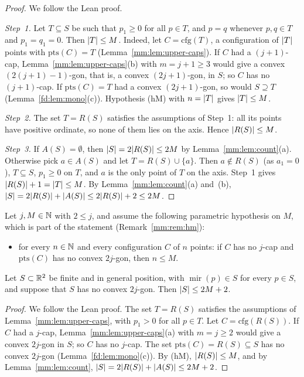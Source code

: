 \begin{proof}
We follow the Lean proof.

\emph{Step~1.} Let $T\subseteq S$ be such that $p_1\ge0$ for all $p\in T$, and $p=q$ whenever $p,q\in T$
and $p_1=q_1=0$. Then $\lvert T\rvert\le M$. Indeed, let $C=\mathrm{cfg}(T)$, a configuration of $\lvert T\rvert$ points
with $\mathrm{pts}(C)=T$ (Lemma~\ref{mm:lem:upper-caps}). If $C$ had a $(j+1)$-cap,
Lemma~\ref{mm:lem:upper-caps}(b) with $m=j+1\ge3$ would give a convex $(2(j+1)-1)$-gon, that is, a convex
$(2j+1)$-gon, in $S$; so $C$ has no $(j+1)$-cap. If $\mathrm{pts}(C)=T$ had a convex $(2j+1)$-gon, so would
$S\supseteq T$ (Lemma~\ref{fd:lem:mono}(c)). Hypothesis (hM) with $n=\lvert T\rvert$ gives $\lvert T\rvert\le M$.

\emph{Step~2.} The set $T=R(S)$ satisfies the assumptions of Step~1: all its points have positive
ordinate, so none of them lies on the axis. Hence $\lvert R(S)\rvert\le M$.

\emph{Step~3.} If $A(S)=\emptyset$, then $\lvert S\rvert=2\lvert R(S)\rvert\le2M$ by Lemma~\ref{mm:lem:count}(a).
Otherwise pick $a\in A(S)$ and let $T=R(S)\cup\{a\}$. Then $a\notin R(S)$ (as $a_1=0$), $T\subseteq S$,
$p_1\ge0$ on $T$, and $a$ is the only point of $T$ on the axis. Step~1 gives
$\lvert R(S)\rvert+1=\lvert T\rvert\le M$. By Lemma~\ref{mm:lem:count}(a) and~(b),
$\lvert S\rvert=2\lvert R(S)\rvert+\lvert A(S)\rvert\le2\lvert R(S)\rvert+2\le2M$.
\end{proof}

\begin{theorem}\label{mm:thm:even}
Let $j,M\in\mathbb N$ with $2\le j$, and assume the following parametric hypothesis on $M$, which is part of the
statement (Remark~\ref{mm:rem:hm}):
\begin{itemize}
\item[(hM)] for every $n\in\mathbb N$ and every configuration $C$ of $n$ points: if $C$ has no $j$-cap and
  $\mathrm{pts}(C)$ has no convex $2j$-gon, then $n\le M$.
\end{itemize}
Let $S\subset\mathbb R^2$ be finite and in general position, with $\operatorname{mir}(p)\in S$ for every $p\in S$,
and suppose that $S$ has no convex $2j$-gon. Then $\lvert S\rvert\le2M+2$.
\end{theorem}

\begin{proof}
We follow the Lean proof. The set $T=R(S)$ satisfies the assumptions of Lemma~\ref{mm:lem:upper-caps},
with $p_1>0$ for all $p\in T$. Let $C=\mathrm{cfg}(R(S))$. If $C$ had a $j$-cap,
Lemma~\ref{mm:lem:upper-caps}(a) with $m=j\ge2$ would give a convex $2j$-gon in $S$; so $C$ has no
$j$-cap. The set $\mathrm{pts}(C)=R(S)\subseteq S$ has no convex $2j$-gon (Lemma~\ref{fd:lem:mono}(c)).
By (hM), $\lvert R(S)\rvert\le M$, and by Lemma~\ref{mm:lem:count},
$\lvert S\rvert=2\lvert R(S)\rvert+\lvert A(S)\rvert\le2M+2$.
\end{proof}

